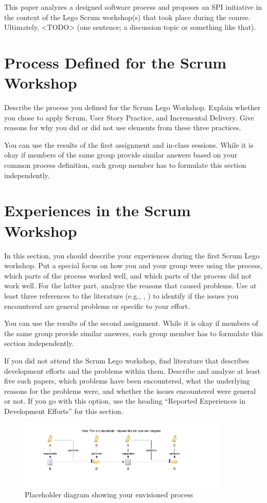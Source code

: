\documentclass[conference]{IEEEtran}
\begin{document}
This paper analyzes a designed software process and proposes an SPI initiative 
in the context of the Lego Scrum workshop(s) that took place during the course.
Ultimately, <TODO> (one sentence; a discussion topic or something like that). 

\section{Process Defined for the Scrum Workshop}
\label{sec:process}
Describe the process you defined for the Scrum Lego Workshop. Explain whether you chose to apply Scrum, User Story Practice, and Incremental Delivery. Give reasons for why you did or did not use elements from these three practices.

You can use the results of the first assignment and in-class sessions. While it is okay if members of the same group provide similar answers based on your common process definition, each group member has to formulate this section independently.

\section{Experiences in the Scrum Workshop}
\label{sec:experiences}
In this section, you should describe your experiences during the first Scrum Lego workshop. Put a special focus on how you and your group were using the process, which parts of the process worked well, and which parts of the process did not work well. For the latter part, analyze the reasons that caused problems. Use at least three references to the literature (e.g., \cite{CaterSteel2006}, \cite{Abrahamsson2002}) to identify if the issues you encountered are general problems or specific to your effort.

You can use the results of the second assignment. While it is okay if members of the same group provide similar answers, each group member has to formulate this section independently.

If you did not attend the Scrum Lego workshop, find literature that describes development efforts and the problems within them. Describe and analyze at least five such papers, which problems have been encountered, what the underlying reasons for the problems were, and whether the issues encountered were general or not. If you go with this option, use the heading ``Reported Experiences in Development Efforts'' for this section.


\begin{figure}
	\centering
	\includegraphics[width=0.9\textwidth]{placeholder_diagram}
	\caption{Placeholder diagram showing your envisioned process}
	\label{fig:placeholderdiagram}
\end{figure}
\end{document}
